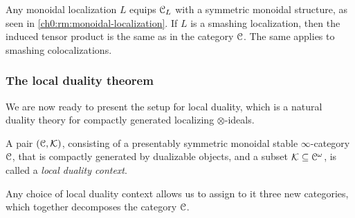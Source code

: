 \begin{remark}
    Any monoidal localization $L$ equips $\EuScript{C}_L$ with a symmetric monoidal structure, as seen in \cref{ch0:rm:monoidal-localization}. If $L$ is a smashing localization, then the induced tensor product is the same as in the category $\EuScript{C}$. The same applies to smashing colocalizations. 
\end{remark}





\subsubsection{The local duality theorem}

We are now ready to present the setup for local duality, which is a natural duality theory for compactly generated localizing $\otimes$-ideals. 

\begin{definition}
    \label{ch0:def:local-duality-context}
    A pair $(\EuScript{C}, \mathcal{K})$, consisting of a presentably symmetric monoidal stable $\infty$-category $\EuScript{C}$, that is compactly generated by dualizable objects, and a subset $\mathcal{K}\subseteq \EuScript{C}^\omega$, is called a \emph{local duality context}.
\end{definition}

Any choice of local duality context allows us to assign to it three new categories, which together decomposes the category $\EuScript{C}$. 

